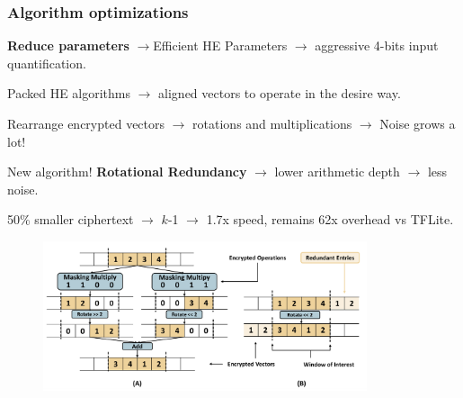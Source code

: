 \documentclass[10pt]{beamer}
\begin{document}
\begin{frame}
\frametitle{Algorithm optimizations}
    \textbf{Reduce parameters} $\rightarrow$Efficient HE Parameters $\rightarrow$ aggressive 4-bits input quantification.
    \vspace{-0.2cm}

    \pause
Packed HE algorithms $\rightarrow$  aligned vectors to operate in the desire way.
    \vspace{-0.2cm}

Rearrange encrypted vectors $\rightarrow$ rotations and multiplications  $\rightarrow$ Noise grows a lot!

    \pause
    \vspace{-0.2cm}
    New algorithm! \textbf{Rotational Redundancy} $\rightarrow$ lower arithmetic depth $\rightarrow$ less noise.

    \vspace{-0.2cm}
    50\% smaller ciphertext $\rightarrow$ $k$-1 $\rightarrow$ 1.7x speed, remains 62x overhead vs TFLite.
    \vspace{-0.2cm}
    \pause
\begin{figure}
    \includegraphics[width=0.85\textwidth]{rotation.png}
\end{figure}
\end{frame}



%
%
%
%
%
%
%
%
\end{document}
